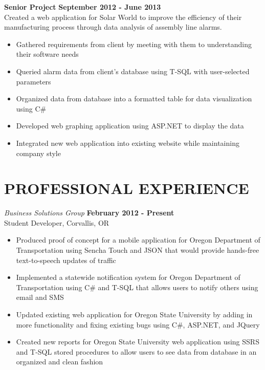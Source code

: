 \documentclass{res}
\begin{document}
\begin{resume}
{\bf Senior Project} \hfill{\bf September 2012 - June 2013}\\
Created a web application for Solar World to improve the efficiency of their manufacturing process through data analysis of assembly line alarms.
    \begin{itemize} \itemsep 1pt
    \item Gathered requirements from client by meeting with them to understanding their software needs
    \item Queried alarm data from client's database using T-SQL with user-selected parameters
    \item Organized data from database into a formatted table for data visualization using C\#
    \item Developed web graphing application using ASP.NET to display the data
    \item Integrated new web application into existing website while maintaining company style
    \end{itemize}

\vspace{0.2in}
\section{PROFESSIONAL EXPERIENCE}
\vspace{8pt}
{\sl Business Solutions Group} \hfill       {\bf February 2012 - Present} \\
Student Developer, Corvallis, OR

   \begin{itemize} \itemsep 1pt %
   \item Produced proof of concept for a mobile application for Oregon Department of Transportation using Sencha Touch and JSON that would provide hands-free text-to-speech updates of traffic
   \item Implemented a statewide notification system for Oregon Department of Transportation using C\# and T-SQL that allows users to notify others using email and SMS
   \item Updated existing web application for Oregon State University by adding in more functionality and fixing existing bugs using C\#, ASP.NET, and JQuery
   \item Created new reports for Oregon State University web application using SSRS and T-SQL stored procedures to allow users to see data from database in an organized and clean fashion
 \end{itemize}
\end{resume}
\end{document}
